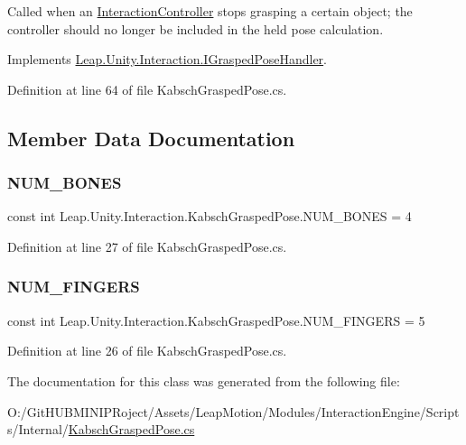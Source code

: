 Called when an \mbox{\hyperlink{class_leap_1_1_unity_1_1_interaction_1_1_interaction_controller}{Interaction\+Controller}} stops grasping a certain object; the controller should no longer be included in the held pose calculation. 



Implements \mbox{\hyperlink{interface_leap_1_1_unity_1_1_interaction_1_1_i_grasped_pose_handler_a7e7305b0089610eced1ee4ca98c3d586}{Leap.\+Unity.\+Interaction.\+I\+Grasped\+Pose\+Handler}}.



Definition at line 64 of file Kabsch\+Grasped\+Pose.\+cs.



\subsection{Member Data Documentation}
\mbox{\label{class_leap_1_1_unity_1_1_interaction_1_1_kabsch_grasped_pose_a6828cd893797a0af43bd25a7e13c5916}} 
\subsubsection{\texorpdfstring{NUM\_BONES}{NUM\_BONES}}
{\footnotesize\ttfamily const int Leap.\+Unity.\+Interaction.\+Kabsch\+Grasped\+Pose.\+N\+U\+M\+\_\+\+B\+O\+N\+ES = 4}



Definition at line 27 of file Kabsch\+Grasped\+Pose.\+cs.

\mbox{\label{class_leap_1_1_unity_1_1_interaction_1_1_kabsch_grasped_pose_ae5b0bd25b1f36d85944840c5178349ce}} 
\subsubsection{\texorpdfstring{NUM\_FINGERS}{NUM\_FINGERS}}
{\footnotesize\ttfamily const int Leap.\+Unity.\+Interaction.\+Kabsch\+Grasped\+Pose.\+N\+U\+M\+\_\+\+F\+I\+N\+G\+E\+RS = 5}



Definition at line 26 of file Kabsch\+Grasped\+Pose.\+cs.



The documentation for this class was generated from the following file\+:\begin{DoxyCompactItemize}
\item 
O\+:/\+Git\+H\+U\+B\+M\+I\+N\+I\+P\+Roject/\+Assets/\+Leap\+Motion/\+Modules/\+Interaction\+Engine/\+Scripts/\+Internal/\mbox{\hyperlink{_kabsch_grasped_pose_8cs}{Kabsch\+Grasped\+Pose.\+cs}}\end{DoxyCompactItemize}

